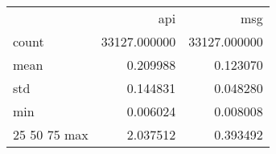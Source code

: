 \begin{tabular}{lrr}
 & api & msg \\
count & 33127.000000 & 33127.000000 \\
mean & 0.209988 & 0.123070 \\
std & 0.144831 & 0.048280 \\
min & 0.006024 & 0.008008 \\
25%
50%
75%
max & 2.037512 & 0.393492 \\
\end{tabular}
